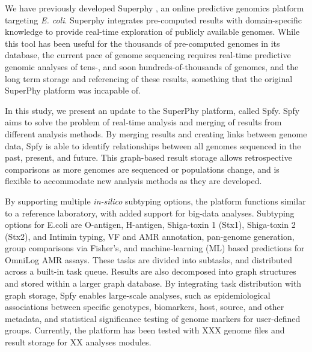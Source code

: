 \documentclass[a4,center,fleqn]{NAR}
\begin{document}
We have previously developed Superphy \cite{whiteside2016superphy}, an online predictive genomics platform targeting \textit{E. coli}. Superphy integrates pre-computed results with domain-specific knowledge to provide real-time exploration of publicly available genomes. While this tool has been useful for the thousands of pre-computed genomes in its database, the current pace of genome sequencing requires real-time predictive genomic analyses of tens-, and soon hundreds-of-thousands of genomes, and the long term storage and referencing of these results, something that the original SuperPhy platform was incapable of.


In this study, we present an update to the SuperPhy platform, called Spfy. Spfy aims to solve the problem of real-time analysis and merging of results from different analysis methods. By merging results and creating links between genome data, Spfy is able to identify relationships between all genomes sequenced in the past, present, and future. This graph-based result storage allows retrospective comparisons as more genomes are sequenced or populations change, and is flexible to accommodate new analysis methods as they are developed.


By supporting multiple \textit{in-silico} subtyping options, the platform functions similar to a reference laboratory, with added support for big-data analyses. Subtyping options for E.coli are O-antigen, H-antigen, Shiga-toxin 1 (Stx1), Shiga-toxin 2 (Stx2), and Intimin typing, VF and AMR annotation, pan-genome generation, group comparisons via Fisher's, and machine-learning (ML) based predictions for OmniLog AMR assays. These tasks are divided into subtasks, and distributed across a built-in task queue. Results are also decomposed into graph structures and stored within a larger graph database. By integrating task distribution with graph storage, Spfy enables large-scale analyses, such as epidemiological associations between specific genotypes, biomarkers, host, source, and other metadata, and statistical significance testing of genome markers for user-defined groups. Currently, the platform has been tested with XXX genome files and result storage for XX analyses modules.
\end{document}
